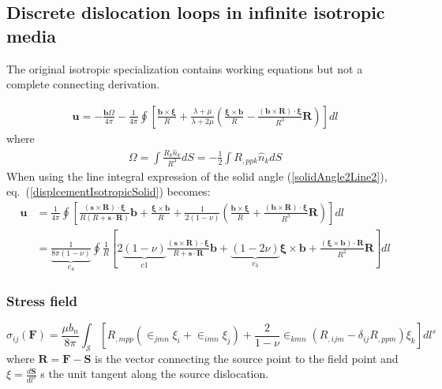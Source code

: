 \subsection{Discrete dislocation loops in infinite isotropic media}
\begin{draftnote}The original isotropic specialization contains working equations but not a complete connecting derivation.\end{draftnote}
\begin{align}
\bm u=-\frac{\bm b\Omega}{4\pi}-\frac{1}{4\pi}\oint\left[\frac{\bm b\times\bm \xi}{R}+\frac{\lambda+\mu}{\lambda+2\mu}\left(\frac{\bm \xi\times\bm b}{R}-\frac{(\bm b\times\bm R)\cdot\bm \xi}{R^3}\bm R\right)\right]dl
\label{displcementIsotropicSolid}
\end{align}
where 
\begin{align}
\Omega=\int\frac{R_k\hat{n}_k}{R^3}dS=-\frac{1}{2}\int R_{,ppk}\hat{n}_kdS
\end{align}
When using the line integral expression of the solid angle (\ref{solidAngle2Line2}), eq.~(\ref{displcementIsotropicSolid}) becomes:
\begin{align}
\bm u&=\frac{1}{4\pi}\oint\left[\frac{(\bm s\times\bm R)\cdot\bm\xi}{R(R+\bm s\cdot\bm R)}\bm b+\frac{\bm \xi\times\bm b}{R}+\frac{1}{2(1-\nu)}\left(\frac{\bm b\times \bm \xi}{R}+\frac{(\bm b\times\bm R)\cdot\bm \xi}{R^3}\bm R\right)\right]dl\nonumber\\
&=\underbrace{\frac{1}{8\pi(1-\nu)}}_{c_4}\oint\frac{1}{R}\left[2\underbrace{(1-\nu)}_{c1}\frac{(\bm s\times\bm R)\cdot\bm\xi}{R+\bm s\cdot\bm R}\bm b+\underbrace{(1-2\nu)}_{c_3}\bm \xi\times\bm b+\frac{(\bm \xi\times\bm b)\cdot\bm R}{R^2}\bm R\right]dl
\label{displcementIsotropicLine}
\end{align}



\subsubsection{Stress field}
\begin{equation}
\sigma_{ij}(\bm F)=\frac{\mu b_n}{8\pi}\int_\mathcal{S} \left[R_{,mpp}\left(\in_{jmn}\xi_i+\in_{imn}\xi_j\right)+\frac{2}{1-\nu}\in_{kmn}\left(R_{,ijm}-\delta_{ij}R_{,ppm}\right)\xi_k\right]dl^s
\end{equation}
where $\bm R=\bm F-\bm S$ is the vector connecting the source point to the field point and $\xi=\frac{d\bm S}{dl^s}$ s the unit tangent along the source dislocation. 

